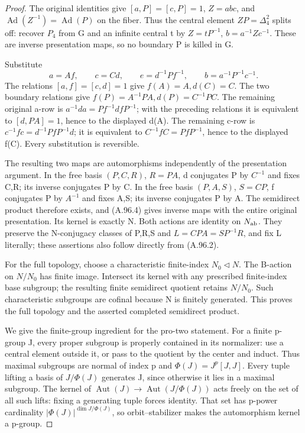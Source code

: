 \begin{proof}
The original identities give \([a,P]=[c,P]=1\),
\(Z=abc\), and \(\operatorname{Ad}(Z^{-1})=\operatorname{Ad}(P)\)
on the fiber. Thus the central element \(ZP=\Delta_4^2\) splits
off: recover \(P_4\) from G and an infinite central t by
\(Z=tP^{-1}\), \(b=a^{-1}Zc^{-1}\). These are inverse
presentation maps, so no boundary P is killed in G.

Substitute
\[
 a=Af,\qquad c=Cd,\qquad e=d^{-1}Pf^{-1},
 \qquad b=a^{-1}P^{-1}c^{-1}.
 \tag{A.96.4}
\]
The relations \([a,f]=[c,d]=1\) give \(f(A)=A,d(C)=C\).
The two boundary relations give \(f(P)=A^{-1}PA,d(P)=C^{-1}PC\).
The remaining original a-row is
\(a^{-1}da=Pf^{-1}dfP^{-1}\); with the preceding relations it
is equivalent to \([d,PA]=1\), hence to the displayed d(A).
The remaining c-row is
\(c^{-1}fc=d^{-1}PfP^{-1}d\); it is equivalent to
\(C^{-1}fC=PfP^{-1}\), hence to the displayed f(C).
Every substitution is reversible.

The resulting two maps are automorphisms independently of the
presentation argument. In the free basis \((P,C,R)\), \(R=PA\),
d conjugates P by \(C^{-1}\) and fixes C,R; its inverse conjugates
P by C. In the free basis \((P,A,S)\), \(S=CP\), f conjugates
P by \(A^{-1}\) and fixes A,S; its inverse conjugates P by A.
The semidirect product therefore exists, and (A.96.4) gives inverse
maps with the entire original presentation. Its kernel is exactly N.
Both actions are identity on \(N_{\rm ab}\). They preserve the
N-conjugacy classes of P,R,S and \(L=CPA=SP^{-1}R\), and fix L
literally; these assertions also follow directly from (A.96.2).

For the full topology, choose a characteristic finite-index
\(N_0\triangleleft N\). The B-action on \(N/N_0\) has finite
image. Intersect its kernel with any prescribed finite-index base
subgroup; the resulting finite semidirect quotient retains
\(N/N_0\). Such characteristic subgroups are cofinal because N is
finitely generated. This proves the full topology and the asserted
completed semidirect product.

We give the finite-group ingredient for the pro-two statement.
For a finite p-group J, every proper subgroup is properly contained
in its normalizer: use a central element outside it, or pass to the
quotient by the center and induct. Thus maximal subgroups are normal
of index p and
\(\Phi(J)=J^p[J,J]\). Every tuple lifting a basis of
\(J/\Phi(J)\) generates J, since otherwise it lies in a maximal
subgroup. The kernel of
\(\operatorname{Aut}(J)\to\operatorname{Aut}(J/\Phi(J))\)
acts freely on the set of all such lifts: fixing a generating tuple
forces identity. That set has p-power cardinality
\(|\Phi(J)|^{\dim J/\Phi(J)}\), so orbit--stabilizer makes the
automorphism kernel a p-group.


\end{proof}
